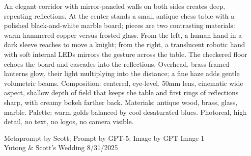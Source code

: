 \documentclass[12pt]{article}
\begin{document}
\noindent
\begin{adjustbox}{max size={\textwidth}{\textheight}}
\begin{varwidth}{\textwidth}
\RaggedRight
\footnotesize
An elegant corridor with mirror-paneled walls on both sides creates deep, repeating reflections. At the center stands a small antique chess table with a polished black-and-white marble board; pieces are two contrasting materials: warm hammered copper versus frosted glass. From the left, a human hand in a dark sleeve reaches to move a knight; from the right, a translucent robotic hand with soft internal LEDs mirrors the gesture across the table. The checkered floor echoes the board and cascades into the reflections. Overhead, brass-framed lanterns glow, their light multiplying into the distance; a fine haze adds gentle volumetric beams. Composition: centered, eye-level, 50mm lens, cinematic wide aspect, shallow depth of field that keeps the table and first rings of reflections sharp, with creamy bokeh farther back. Materials: antique wood, brass, glass, marble. Palette: warm golds balanced by cool desaturated blues. Photoreal, high detail, no text, no logos, no camera visible.
\end{varwidth}
\end{adjustbox}
\vfill
{\raggedleft\footnotesize
Metaprompt by Scott; Prompt by GPT-5; Image by GPT Image 1 \\
Yutong \& Scott's Wedding 8/31/2025\par}
\end{document}
